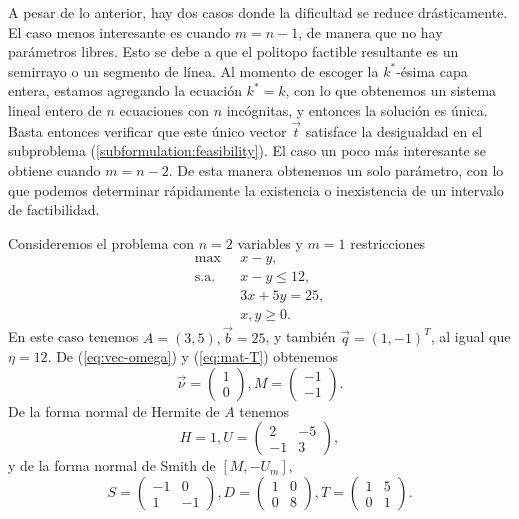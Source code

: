 A pesar de lo anterior, hay dos casos donde la dificultad se reduce drásticamente. El caso menos
interesante es cuando $m = n - 1$, de manera que no hay parámetros libres. Esto se debe a que el
politopo factible resultante es un semirrayo o un segmento de línea. Al momento de escoger la
$k^*$-ésima capa entera, estamos agregando la ecuación $k^* = k$, con lo que obtenemos un sistema
lineal entero de $n$ ecuaciones con $n$ incógnitas, y entonces la solución es única. Basta entonces
verificar que este único vector $\vec{t}$ satisface la desigualdad en el subproblema
(\ref{subformulation:feasibility}). El caso un poco más interesante se obtiene cuando $m = n - 2$.
De esta manera obtenemos un solo parámetro, con lo que podemos determinar rápidamente la existencia
o inexistencia de un intervalo de factibilidad.

\begin{example}
	\label{ex:two-var}
	Consideremos el problema con $n = 2$ variables y $m = 1$ restricciones
	\begin{align*}
		\max
			~& x - y, \\
		\text{s.a.} \quad
			& x - y \leq 12, \\
			& 3x + 5y = 25, \\
			& x, y \geq 0.
	\end{align*}
	En este caso tenemos $A = (3, 5), \vec{b} = 25$, y también $\vec{q} = (1, -1)^T$, al igual que
	$\eta = 12$. De (\ref{eq:vec-omega}) y (\ref{eq:mat-T}) obtenemos
	\begin{equation*}
		\vec{\nu} = \begin{pmatrix} 1 \\ 0 \end{pmatrix},
		M = \begin{pmatrix} -1 \\ -1 \end{pmatrix}.
	\end{equation*}
	De la forma normal de Hermite de $A$ tenemos
	\begin{equation*}
		H = 1, U = \begin{pmatrix} 2 & -5 \\ -1 & 3 \end{pmatrix},
	\end{equation*}
	y de la forma normal de Smith de $[M, -U_m]$,
	\begin{equation*}
		S = \begin{pmatrix} -1 & 0 \\ 1 & -1 \end{pmatrix},
		D = \begin{pmatrix} 1 & 0 \\ 0 & 8 \end{pmatrix},
		T = \begin{pmatrix} 1 & 5 \\ 0 & 1 \end{pmatrix}. 
	\end{equation*}


\end{example}
